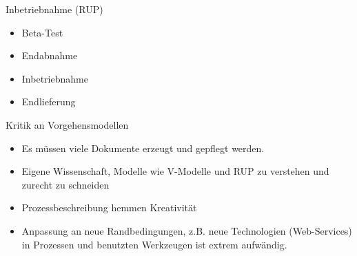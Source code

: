 \begin{bonus}{Inbetriebnahme (RUP)}
    \begin{itemize}
        \item Beta-Test
        \item Endabnahme
        \item Inbetriebnahme
        \item Endlieferung
    \end{itemize}
\end{bonus}


\begin{bonus}{Kritik an Vorgehensmodellen}
    \begin{itemize}
        \item Es müssen viele Dokumente erzeugt und gepflegt werden.
        \item Eigene Wissenschaft, Modelle wie V-Modelle und RUP zu verstehen und zurecht zu schneiden
        \item Prozessbeschreibung hemmen Kreativität
        \item Anpassung an neue Randbedingungen, z.B. neue Technologien (Web-Services) in Prozessen und benutzten Werkzeugen ist extrem aufwändig.
    \end{itemize}
\end{bonus}

